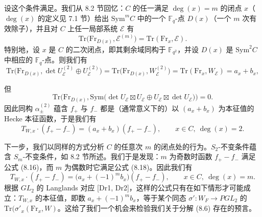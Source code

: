 \documentclass[11pt,a4paper]{article}
\begin{document}
设这个条件满足。我们从 8.2 节回忆：$C$ 的任一满足 $\deg(x)=m$ 的闭点 $x$（$\deg(x)$ 的定义见 7.1 节）给出 $\mathrm{Sym}^m C$ 中的一个 $\mathbb{F}_q$-点 $D(x)$（一个 $m$ 次有效除子），并且对 $C$ 上任一局部系统 $\mathcal{E}$ 有
\[
\mathrm{Tr}\bigl(\mathrm{Fr}_{D(x)}, \mathcal{E}^{(m)}\bigr) = \mathrm{Tr}(\mathrm{Fr}_x, \mathcal{E}).
\]
特别地，设 $x$ 是 $C$ 的二次闭点，即其剩余域同构于 $\mathbb{F}_{q^2}$，并设 $D(x)$ 是 $\mathrm{Sym}^2 C$ 中相应的 $\mathbb{F}_q$-点。则我们有
\[
\mathrm{Tr}\bigl(\mathrm{Fr}_{D(x)}, \det U_{\mathcal{E}}^{(2)}\oplus U_{\mathcal{E}}^{(2)}\bigr) = \mathrm{Tr}\bigl(\mathrm{Fr}_{D(x)}, W_{\mathcal{E}}^{(2)}\bigr) = \mathrm{Tr}(\mathrm{Fr}_x, W_{\mathcal{E}}) = a_x + b_x,
\]

但
\[
\mathrm{Tr}\bigl(\mathrm{Fr}_{D(x)}, \mathrm{Sym}\bigl(\det U_{\mathcal{E}}\boxtimes U_{\mathcal{E}}\oplus U_{\mathcal{E}}\boxtimes \det U_{\mathcal{E}}\bigr)\bigr) = 0.
\]
因此同构 $\alpha_\pm^{(2)}$ 蕴含 $f_+$ 与 $f_-$ 都是（通常意义下的）以 $(a_x + b_x)$ 为本征值的 Hecke 本征函数，于是我们有
\begin{equation}\tag{8.18}
T_{W,x}\cdot (f_+ - f_-) = (a_x + b_x)(f_+ - f_-), \qquad x\in C,\ \deg(x) = 2.
\end{equation}


下一步，我们以同样的方式分析 $C$ 的任意次 $m$ 的闭点处的行为。$S_2$-不变条件蕴含 $S_m$-不变条件，如 8.2 节所述。我们于是发现：$m$ 为奇数时函数 $f_+ - f_-$ 满足公式 (8.16)，而 $m$ 为偶数时它满足公式 (8.18)。因此我们有
\begin{equation}\tag{8.19}
T_{W,x}\cdot (f_+ - f_-) = \bigl(a_x + (-1)^m b_x\bigr)(f_+ - f_-), \qquad x\in C,\ \deg(x) = m.
\end{equation}
根据 $GL_2$ 的 Langlands 对应 [Dr1, Dr2]，这样的公式只有在如下情形才可能成立：$T_{W,x}$ 的本征值，即数 $a_x + (-1)^m b_x$，等于某个同态 $\sigma' : W_F \to PGL_2$ 的 $\mathrm{Tr}(\sigma'_x(\mathrm{Fr}_x, W)$。这给了我们一个机会来检验我们关于分解 (8.6) 存在的预言。
\end{document}
